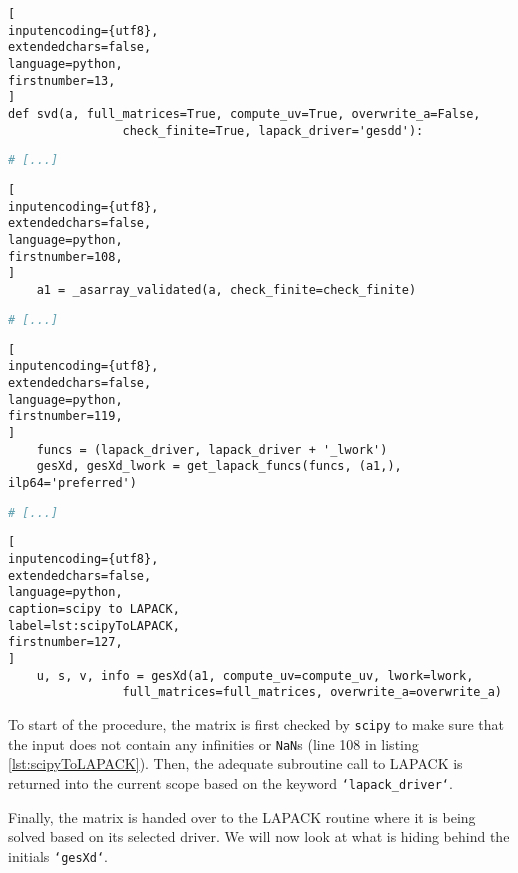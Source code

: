 \begin{lstlisting}[
inputencoding={utf8}, 
extendedchars=false, 
language=python,
firstnumber=13,
]
def svd(a, full_matrices=True, compute_uv=True, overwrite_a=False,
        		check_finite=True, lapack_driver='gesdd'):
\end{lstlisting}
%
%
%
\spacingConcatLists
\begin{lstlisting}[language=python, numbers=none]
    # [...]
\end{lstlisting}
%
%
%
\spacingConcatLists
\begin{lstlisting}[
inputencoding={utf8}, 
extendedchars=false, 
language=python,
firstnumber=108,
]
    a1 = _asarray_validated(a, check_finite=check_finite)
\end{lstlisting}
%
%
%
\spacingConcatLists
\begin{lstlisting}[language=python, numbers=none]
    # [...]
\end{lstlisting}
%
%
%
\spacingConcatLists
\begin{lstlisting}[
inputencoding={utf8}, 
extendedchars=false, 
language=python,
firstnumber=119,
]
    funcs = (lapack_driver, lapack_driver + '_lwork')
    gesXd, gesXd_lwork = get_lapack_funcs(funcs, (a1,), ilp64='preferred')
\end{lstlisting}
%
%
%
\spacingConcatLists
\begin{lstlisting}[language=python, numbers=none]
    # [...]
\end{lstlisting}
%
%
%
\spacingConcatLists
\begin{lstlisting}[
inputencoding={utf8}, 
extendedchars=false, 
language=python, 
caption=scipy to LAPACK, 
label=lst:scipyToLAPACK,
firstnumber=127,
]
    u, s, v, info = gesXd(a1, compute_uv=compute_uv, lwork=lwork,
                full_matrices=full_matrices, overwrite_a=overwrite_a)
\end{lstlisting}



\noindent
To start of the procedure, the matrix is first checked by \texttt{scipy} to make sure that the input does not contain any infinities or \texttt{NaN}s (line 108 in listing \ref{lst:scipyToLAPACK}).
Then, the adequate subroutine call to LAPACK is returned into the current scope based on the keyword \texttt{`lapack\_driver`}.

Finally, the matrix is handed over to the LAPACK routine where it is being solved based on its selected driver.
We will now look at what is hiding behind the initials \texttt{`gesXd`}.
\bigskip

